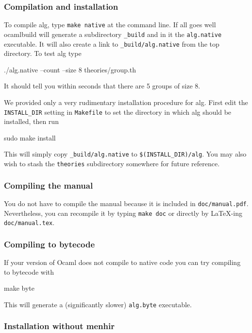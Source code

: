 \documentclass{article}
\begin{document}
\subsubsection{Compilation and installation}

To compile alg, type \texttt{make native} at the command line. If all
goes well ocamlbuild will generate a subdirectory \texttt{\_build} and
in it the \texttt{alg.native} executable. It will also create a link
to \texttt{\_build/alg.native} from the top directory. To test alg
type
%
\begin{shell}
./alg.native --count --size 8 theories/group.th
\end{shell}
%
It should tell you within seconds that there are 5 groups of size 8. 

We provided only a very rudimentary installation procedure for alg.
First edit the \texttt{INSTALL\_DIR} setting in \texttt{Makefile} to
set the directory in which alg should be installed, then run
%
\begin{shell}
sudo make install
\end{shell}
%
This will simply copy \texttt{\_build/alg.native} to
\texttt{\$(INSTALL\_DIR)/alg}. You may also wish to stash the
\texttt{theories} subdirectory somewhere for future reference.

\subsubsection{Compiling the manual}
\label{sec:compiling-manual}

You do not have to compile the manual because it is included in
\texttt{doc/manual.pdf}. Nevertheless, you can recompile it by typing
\texttt{make doc} or directly by {\LaTeX}-ing \texttt{doc/manual.tex}.

\subsubsection{Compiling to bytecode}

If your version of Ocaml does not compile to native code you can try
compiling to bytecode with
%
\begin{shell}
make byte
\end{shell}
%
This will generate a (significantly slower) \texttt{alg.byte} executable.

\subsubsection{Installation without menhir}
\label{sec:nomenhir}
\end{document}
